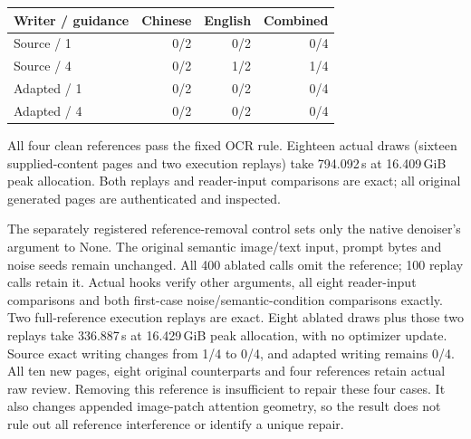 \begin{center}\begin{tabular}{lrrr}
Writer / guidance & Chinese & English & Combined\\\hline
Source / 1 & 0/2 & 0/2 & 0/4\\
Source / 4 & 0/2 & 1/2 & 1/4\\
Adapted / 1 & 0/2 & 0/2 & 0/4\\
Adapted / 4 & 0/2 & 0/2 & 0/4\\
\end{tabular}\end{center}
All four clean references pass the fixed OCR rule. Eighteen actual draws
(sixteen supplied-content pages and two execution replays) take 794.092\,s
at 16.409\,GiB peak allocation. Both replays and reader-input comparisons
are exact; all original generated pages are authenticated and inspected.

The separately registered reference-removal control sets only the native
denoiser's  argument to None. The original semantic
image/text input, prompt bytes and noise seeds remain unchanged. All 400
ablated calls omit the reference; 100 replay calls retain it. Actual hooks
verify other arguments, all eight reader-input comparisons and both first-case
noise/semantic-condition comparisons exactly. Two full-reference execution
replays are exact. Eight ablated draws plus those two replays take 336.887\,s
at 16.429\,GiB peak allocation, with no optimizer update. Source exact writing
changes from 1/4 to 0/4, and adapted writing remains 0/4. All ten new pages,
eight original counterparts and four references retain actual raw review.
Removing this reference is insufficient to repair these four cases. It also
changes appended image-patch attention geometry, so the result does not rule
out all reference interference or identify a unique repair.

\clearpage
{}

